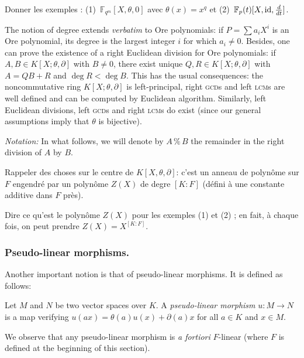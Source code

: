 \documentclass[a4paper]{llncs}
\def\todo#1{{\color{todo} #1}}
\newcommand{\FF}{\mathbb F}
\newcommand{\id}{\textrm{\rm id}}
\renewcommand{\mod}{\,\%\,}
\begin{document}
\begin{example}
\todo{Donner les exemples :
(1)~$\FF_{q^m}[X,\theta,0]$ avec $\theta(x) = x^q$ et
(2)~$\FF_p(t)[X,\id,\frac d{dt}]$.}
\end{example}

The notion of degree extends \emph{verbatim} to Ore polynomials: if $P = 
\sum a_iX^i$ is an Ore polynomial, its degree is the largest integer $i$ 
for which $a_i \neq 0$.
Besides, one can prove the existence of a right Euclidean division for 
Ore polynomials: if $A, B \in K[X;\theta,\partial]$ with $B \neq 0$, 
there exist unique $Q, R \in K[X;\theta,\partial]$ with $A = QB+R$ and 
$\deg R < \deg B$. This has the usual consequences: the noncommutative
ring $K[X;\theta,\partial]$ is left-principal, right \textsc{gcd}s and
left \textsc{lcm}s are well defined and can be computed by Euclidean
algorithm. 
Similarly, left Euclidean divisions, left \textsc{gcd}s and right 
\textsc{lcm}s do exist (since our general assumptions imply that
$\theta$ is bijective).

\medskip

\noindent
\textit{Notation:}
In what follows, we will denote by $A \mod B$ the remainder in the 
right division of $A$ by $B$.

\todo{Rappeler des choses sur le centre de $K[X,\theta,\partial]$:
c'est un anneau de polynôme sur $F$ engendré par un polynôme $Z(X)$
de degre $[K:F]$ (défini à une constante additive dans $F$ près).}

\begin{example}
\todo{Dire ce qu'est le polynôme $Z(X)$ pour les exemples (1) et (2) ; 
en fait, à chaque fois, on peut prendre $Z(X) = X^{[K:F]}$.}
\end{example}

\subsubsection*{Pseudo-linear morphisms.}

Another important notion is that of pseudo-linear morphisms. It is 
defined as follows:

\begin{definition}
Let $M$ and $N$ be two vector spaces over $K$.
A \emph{pseudo-linear morphism} $u : M\to N$ is a map verifying 
$u(ax) = \theta(a)u(x) + \partial(a)x$ for all $a \in K$ and $x \in M$.
\end{definition}

We observe that any pseudo-linear morphism is \emph{a fortiori}
$F$-linear (where $F$ is defined at the beginning of this section).
\end{document}
